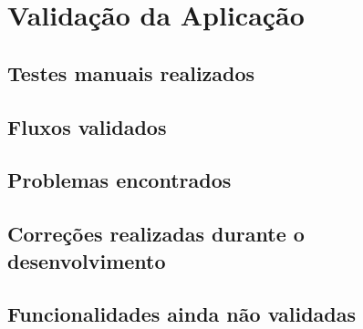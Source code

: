 \section{Validação da Aplicação}

\subsection{Testes manuais realizados}

\subsection{Fluxos validados}

\subsection{Problemas encontrados}

\subsection{Correções realizadas durante o desenvolvimento}

\subsection{Funcionalidades ainda não validadas}